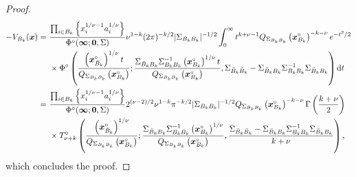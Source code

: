 \documentclass[12pt]{article}
\begin{document}
\begin{proof}
\begin{align*}
 -V_{B_k}(\bm x)  =&\ \frac{\prod_{i\in B_k} \left\{ x_i^{1/\nu-1}a_i^{1/\nu}\right\}}{\Phi^\circ(\bm \infty;\bm 0, \Sigma)} \nu^{1-k} (2\pi)^{-k/2}|\Sigma_{B_k B_k}|^{-1/2}\int_0^\infty t^{k+\nu-1} Q_{\Sigma_{B_k B_k}} \left(\bm x_{B_k}^\circ\right)^{-k-\nu} e^{-t^2/2} \\
 &\ \times \Phi^\circ \left( \frac{\left(\bm x_{\bar{B}_k}^\circ \right)^{1/\nu} t}{Q_{\Sigma_{B_k B_k}}\left(\bm x_{B_k}^\circ\right)}; \frac{\Sigma_{\bar{B}_k B_k}\Sigma_{B_k B_k}^{-1}\left(\bm x_{B_k}^\circ\right)^{1/\nu}t}{Q_{\Sigma_{B_k B_k}} \left(\bm x_{B_k}^\circ\right)},\Sigma_{\bar{B}_k \bar{B}_k}-\Sigma_{\bar{B}_k B_k}\Sigma_{B_k B_k}^{-1}\Sigma_{\bar{B}_k B_k} \right) \text dt  \\
 =&\ \frac{\prod_{i\in B_k} \left\{ x_i^{1/\nu-1}a_i^{1/\nu}\right\}}{\Phi^\circ(\bm \infty;\bm 0, \Sigma)} 2^{(\nu-2)/2} \nu^{1-k} \pi^{-k/2}|\Sigma_{B_k B_k}|^{-1/2} Q_{\Sigma_{B_k B_k}}\left(\bm x_{B_k}^\circ\right)^{-k-\nu} \Gamma\left(\frac{k+\nu}{2}\right) \\  
 &\ \times T_{\nu+k}^\circ \left( \frac{\left(\bm x_{\bar{B}_k}^\circ \right)^{1/\nu}}{Q_{\Sigma_{B_k B_k}} \left( \bm x_{B_k}^\circ \right)}; \frac{\Sigma_{\bar{B}_k B_k}\Sigma_{B_k B_k}^{-1}\left(\bm x_{B_k}^\circ\right)^{1/\nu}}{Q_{\Sigma_{B_k B_k}}\left(\bm x_{B_k}^\circ\right)}, \frac{\Sigma_{\bar{B}_k \bar{B}_k}-\Sigma_{\bar{B}_k B_k}\Sigma_{B_k B_k}^{-1}\Sigma_{\bar{B}_k B_k}}{k+\nu} \right), 
 \end{align*} 
which concludes the proof.
%
\end{proof}
\end{document}
